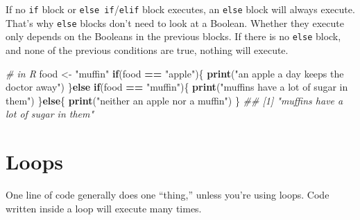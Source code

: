 \documentclass[12pt,krantz2]{krantz}
\makeatletter
\newenvironment{Shaded}{\begin{snugshade}}{\end{snugshade}}
\newcommand{\BuiltInTok}[1]{#1}
\newcommand{\CommentTok}[1]{\textcolor[rgb]{0.37,0.37,0.37}{\textit{#1}}}
\newcommand{\ControlFlowTok}[1]{\textcolor[rgb]{0.27,0.27,0.27}{\textbf{#1}}}
\newcommand{\DecValTok}[1]{\textcolor[rgb]{0.06,0.06,0.06}{#1}}
\newcommand{\FloatTok}[1]{\textcolor[rgb]{0.06,0.06,0.06}{#1}}
\newcommand{\KeywordTok}[1]{\textcolor[rgb]{0.27,0.27,0.27}{\textbf{#1}}}
\newcommand{\NormalTok}[1]{#1}
\newcommand{\OperatorTok}[1]{\textcolor[rgb]{0.43,0.43,0.43}{\textbf{#1}}}
\newcommand{\StringTok}[1]{\textcolor[rgb]{0.5,0.5,0.5}{#1}}
\newenvironment{kframe}{%
\medskip{}
\setlength{\fboxsep}{.8em}
 \def\at@end@of@kframe{}%
 \ifinner\ifhmode%
  \def\at@end@of@kframe{\end{minipage}}%
  \begin{minipage}{\columnwidth}%
 \fi\fi%
 \def\FrameCommand##1{\hskip\@totalleftmargin \hskip-\fboxsep
 \colorbox{shadecolor}{##1}\hskip-\fboxsep
     \hskip-\linewidth \hskip-\@totalleftmargin \hskip\columnwidth}%
 \MakeFramed {\advance\hsize-\width
   \@totalleftmargin\z@ \linewidth\hsize
   \@setminipage}}%
 {\par\unskip\endMakeFramed%
 \at@end@of@kframe}
\renewenvironment{Shaded}{\begin{kframe}}{\end{kframe}}
\makeatother
\begin{document}
If no \texttt{if} block or \texttt{else\ if}/\texttt{elif} block executes, an \texttt{else} block will always execute. That's why \texttt{else} blocks don't need to look at a Boolean. Whether they execute only depends on the Booleans in the previous blocks. If there is no \texttt{else} block, and none of the previous conditions are true, nothing will execute.

\begin{Shaded}
\begin{Highlighting}[]
\CommentTok{# in R}
\NormalTok{food <-}\StringTok{ "muffin"}
\ControlFlowTok{if}\NormalTok{(food }\OperatorTok{==}\StringTok{ "apple"}\NormalTok{)\{}
    \KeywordTok{print}\NormalTok{(}\StringTok{"an apple a day keeps the doctor away"}\NormalTok{)}
\NormalTok{\}}\ControlFlowTok{else} \ControlFlowTok{if}\NormalTok{(food }\OperatorTok{==}\StringTok{ "muffin"}\NormalTok{)\{}
  \KeywordTok{print}\NormalTok{(}\StringTok{"muffins have a lot of sugar in them"}\NormalTok{)}
\NormalTok{\}}\ControlFlowTok{else}\NormalTok{\{}
  \KeywordTok{print}\NormalTok{(}\StringTok{"neither an apple nor a muffin"}\NormalTok{)}
\NormalTok{\}}
\CommentTok{## [1] "muffins have a lot of sugar in them"}
\end{Highlighting}
\end{Shaded}

\begin{Shaded}
\end{Shaded}

\hypertarget{loops}{%
\section{Loops}\label{loops}}

One line of code generally does one ``thing,'' unless you're using loops. Code written inside a loop will execute many times.
\end{document}
